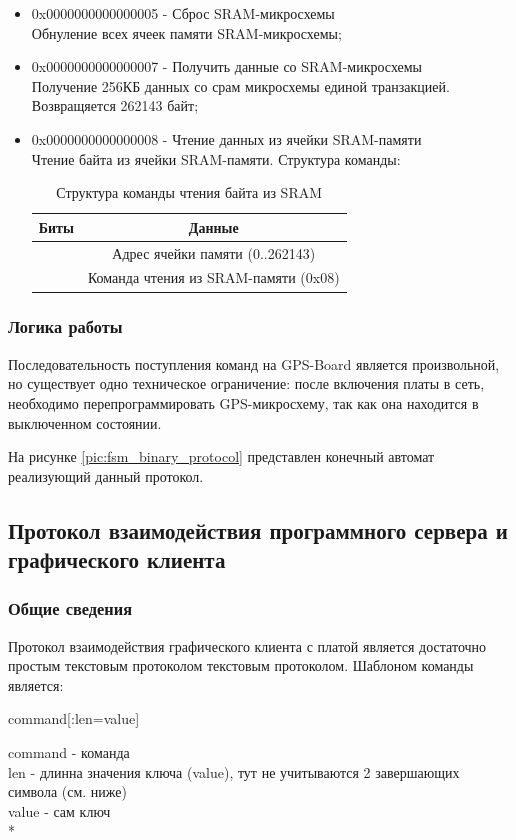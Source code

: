 \begin{itemize}
\item 0x0000000000000005 - Сброс SRAM-микросхемы \\ 
	Обнуление всех ячеек памяти SRAM-микросхемы;

\item 0x0000000000000007 - Получить данные со SRAM-микросхемы \\ 
	Получение 256КБ данных со срам микросхемы единой транзакцией. Возвращяется 262143 байт;

\item 0x0000000000000008 - Чтение данных из ячейки SRAM-памяти \\ 
	Чтение байта из ячейки SRAM-памяти. Структура команды:
	\begin{table}[H]
	\begin{center}
	\caption{Структура команды чтения байта из SRAM}
	\label{tab:read_sram}
	\begin{tabular}{|c|c|}
		\hline
			Биты & Данные \\
		\hline
			[25:08] & Адрес ячейки памяти (0..262143) \\
		\hline
			[07:00] & Команда чтения из SRAM-памяти (0x08) \\
		\hline
	\end{tabular}
	\end{center}
	\end{table}
\end{itemize}

\subsubsection{Логика работы}
Последовательность поступления команд на GPS-Board является произвольной, но существует одно техническое ограничение: 
после включения платы в сеть, необходимо перепрограммировать GPS-микросхему, так как она находится в выключенном состоянии.

На рисунке \ref{pic:fsm_binary_protocol} представлен конечный автомат реализующий данный протокол.

\subsection{Протокол взаимодействия программного сервера и графического клиента}
\subsubsection{Общие сведения}
Протокол взаимодействия графического клиента с платой является достаточно простым текстовым протоколом текстовым протоколом. Шаблоном
команды является:
\begin{center}
command[:len=value]
\end{center}
command - команда \\
len - длинна значения ключа (value), тут не учитываются 2 завершающих символа (см. ниже)\\
value - сам ключ \\*

